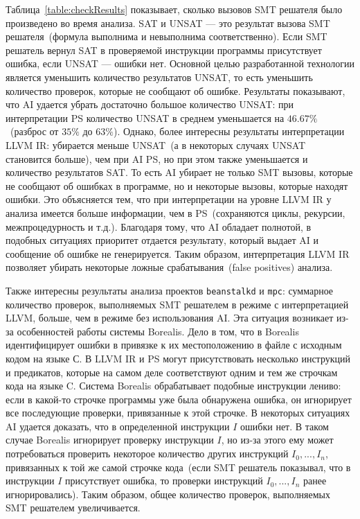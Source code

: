 Таблица~\ref{table:checkResults} показывает, сколько вызовов SMT решателя было
произведено во время анализа. SAT и UNSAT --- это результат вызова 
SMT решателя~(формула выполнима и невыполнима соответственно). Если SMT решатель
вернул SAT в проверяемой инструкции программы присутствует ошибка, если 
UNSAT --- ошибки нет. Основной целью разработанной технологии является уменьшить
количество результатов UNSAT, то есть уменьшить количество проверок, которые не
сообщают об ошибке. Результаты показывают, что AI удается убрать достаточно 
большое количество UNSAT: при интерпретации PS количество UNSAT в среднем 
уменьшается на $46.67\%$~(разброс от $35\%$ до $63\%$). Однако, более интересны 
результаты интерпретации LLVM IR: убирается меньше UNSAT~(а в некоторых
случаях UNSAT становится больше), чем при AI PS, но при этом также уменьшается 
и количество результатов SAT. То есть AI убирает не только SMT вызовы, которые 
не сообщают об ошибках в программе, но и некоторые вызовы, которые находят 
ошибки. Это объясняется тем, что при интерпретации на уровне LLVM IR у анализа 
имеется больше информации, чем в PS~(сохраняются циклы, рекурсии, 
межпроцедурность и т.д.). Благодаря тому, что AI обладает полнотой, в подобных
ситуациях приоритет отдается результату, который выдает AI и сообщение об
ошибке не генерируется. Таким образом, интерпретация LLVM IR позволяет убирать
некоторые ложные срабатывания~(false positives) анализа.

Также интересны результаты анализа проектов \texttt{beanstalkd} и \texttt{mpc}:
суммарное количество проверок, выполняемых SMT решателем в режиме с 
интерпретацией LLVM, больше, чем в режиме без использования AI. Эта ситуация
возникает из-за особенностей работы системы Borealis. Дело в том, что в Borealis
идентифицирует ошибки в привязке к их местоположению в файле с исходным кодом на
языке С. В LLVM IR и PS могут присутствовать несколько инструкций и предикатов, 
которые на самом деле соответствуют одним и тем же строчкам кода на языке C.
Система Borealis обрабатывает подобные инструкции лениво: если в какой-то
строчке программы уже была обнаружена ошибка, он игнорирует все последующие 
проверки, привязанные к этой строчке. В некоторых ситуациях AI удается доказать,
что в определенной инструкции $I$ ошибки нет. В таком случае Borealis игнорирует
проверку инструкции $I$, но из-за этого ему может потребоваться проверить 
некоторое количество других инструкций $I_0, ..., I_n$, привязанных к той же 
самой строчке кода~(если SMT решатель показывал, что в инструкции $I$ 
присутствует ошибка, то проверки инструкций $I_0, ..., I_n$ ранее 
игнорировались). Таким образом, общее количество проверок, выполняемых 
SMT решателем увеличивается.

